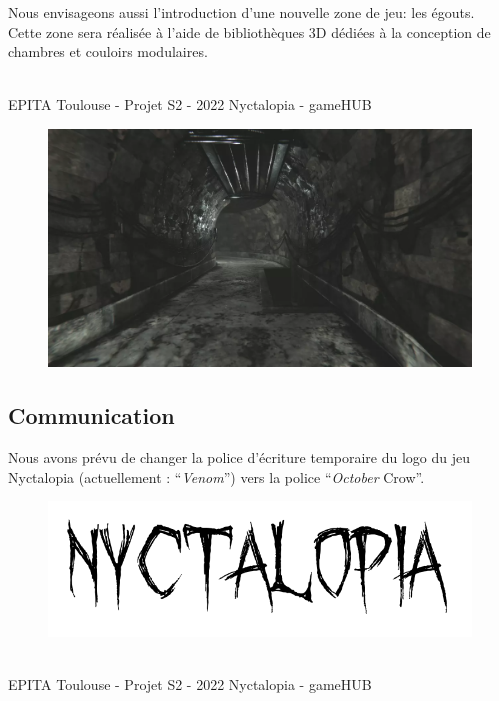 Nous envisageons aussi l'introduction d'une nouvelle zone de jeu: les égouts. Cette zone sera réalisée à l'aide de bibliothèques 3D dédiées à la conception de chambres et couloirs modulaires.

\vfill
\noindent\makebox[\linewidth]{\rule{.8\paperwidth}{.6pt}}\\[0.2cm]
EPITA Toulouse - Projet S2 - 2022 \hfill Nyctalopia - gameHUB
\noindent\makebox[\linewidth]{\rule{.8\paperwidth}{.6pt}}

\newpage

\begin{figure}[H]
\centering
\begin{minipage}{.5\textwidth}
  \centering
  \centerline{\includegraphics[width=1\linewidth]{img/assets/egouts1.png}}
  \label{fig:fusebox}
\end{minipage}%
\end{figure}

\subsection{Communication}

Nous avons prévu de changer la police d'écriture temporaire du logo du jeu Nyctalopia (actuellement : ``\emph{Venom}'') vers la police ``\emph{October} Crow''.

\begin{figure}[H]
\centering
\begin{minipage}{.5\textwidth}
  \centering
  \centerline{\includegraphics[width=1.5\linewidth]{img/font.png}}
  \label{fig:octobercrowfont}
\end{minipage}%
\end{figure}

\vfill
\noindent\makebox[\linewidth]{\rule{.8\paperwidth}{.6pt}}\\[0.2cm]
EPITA Toulouse - Projet S2 - 2022 \hfill Nyctalopia - gameHUB
\noindent\makebox[\linewidth]{\rule{.8\paperwidth}{.6pt}}

\newpage